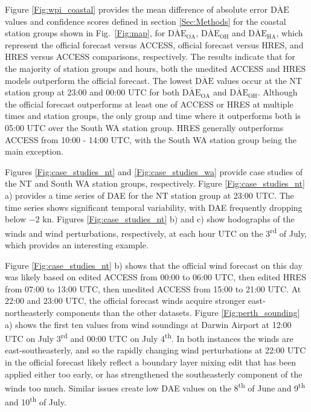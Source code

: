 \documentclass{ametsoc}
\begin{document}
Figure \ref{Fig:wpi_coastal} provides the mean difference of absolute error $\overline{\text{DAE}}$ values and confidence scores defined in section \ref{Sec:Methods} for the coastal station groups shown in Fig.~\ref{Fig:map}, for $\overline{\text{DAE}}_\text{OA}$, $\overline{\text{DAE}}_\text{OH}$ and $\overline{\text{DAE}}_\text{HA}$, which represent the official forecast versus ACCESS, official forecast versus HRES, and HRES versus ACCESS comparisons, respectively. The results indicate that for the majority of station groups and hours, both the unedited ACCESS and HRES models outperform the official forecast. The lowest $\overline{\text{DAE}}$ values occur at the NT station group at 23:00 and 00:00 UTC for both $\overline{\text{DAE}}_\text{OA}$ and $\overline{\text{DAE}}_\text{OH}$. Although the official forecast outperforms at least one of ACCESS or HRES at multiple times and station groups, the only group and time where it outperforms both is 05:00 UTC over the South WA station group. HRES generally outperforms ACCESS from 10:00 - 14:00 UTC, with the South WA station group being the main exception.    

Figures \ref{Fig:case_studies_nt} and \ref{Fig:case_studies_wa} provide case studies of the NT and South WA station groups, respectively. Figure \ref{Fig:case_studies_nt} a) provides a time series of DAE for the NT station group at 23:00 UTC. The time series shows significant temporal variability, with DAE frequently dropping below $-2$ kn. Figures \ref{Fig:case_studies_nt} b) and c) show hodographs of the winds and wind perturbations, respectively, at each hour UTC on the 3\textsuperscript{rd} of July, which provides an interesting example. 

Figure \ref{Fig:case_studies_nt} b) shows that the official wind forecast on this day was likely based on edited ACCESS from 00:00 to 06:00 UTC, then edited HRES from 07:00 to 13:00 UTC, then unedited ACCESS from 15:00 to 21:00 UTC. At 22:00 and 23:00 UTC, the official forecast winds acquire stronger east-northeasterly components than the other datasets. Figure \ref{Fig:perth_sounding} a) shows the first ten values from wind soundings at Darwin Airport at 12:00 UTC on July 3\textsuperscript{rd} and 00:00 UTC on July 4\textsuperscript{th}. In both instances the winds are east-southeasterly, and so the rapidly changing wind perturbations at 22:00 UTC in the official forecast likely reflect a boundary layer mixing edit that has been applied either too early, or has strengthened the southeasterly component of the winds too much. Similar issues create low DAE values on the 8\textsuperscript{th} of June and 9\textsuperscript{th} and 10\textsuperscript{th} of July.
\end{document}
